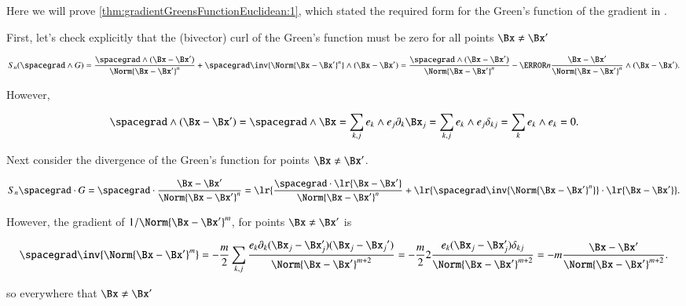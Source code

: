 %
%
\label{chap:gradientGreensFunctionProof}
Here we will prove \cref{thm:gradientGreensFunctionEuclidean:1}, which stated the required form for the Green's function of the gradient in .

First, let's check explicitly that the 
(bivector) curl of the Green's function must be zero for all
points \( \Bx \ne \Bx' \)

\begin{dmath}\label{eqn:gradientGreensFunctionEuclidean:140}
S_n (\spacegrad \wedge G)
=
\frac{\spacegrad \wedge (\Bx-\Bx')}{\Norm{\Bx - \Bx'}^{n}}
+
\spacegrad \inv{\Norm{\Bx - \Bx'}^{n}} \wedge (\Bx-\Bx')
=
\frac{\spacegrad \wedge (\Bx-\Bx')}{\Norm{\Bx - \Bx'}^{n}}
- \cancel{n
\frac{\Bx - \Bx'}{\Norm{\Bx - \Bx'}^{n}} \wedge (\Bx-\Bx')}.
\end{dmath}

However,

\begin{dmath}\label{eqn:gradientGreensFunctionEuclidean:160}
\spacegrad \wedge (\Bx-\Bx')
=
\spacegrad \wedge \Bx
=
\sum_{k,j} e_k \wedge e_j \partial_k \Bx_j
=
\sum_{k,j} e_k \wedge e_j \delta_{k j}
=
\sum_{k} e_k \wedge e_k
=
0.
\end{dmath}

Next consider the divergence of the Green's function for points \( \Bx \ne \Bx' \).

\begin{dmath}\label{eqn:gradientGreensFunctionEuclidean:120}
S_n \spacegrad \cdot G
=
\spacegrad \cdot \frac{\Bx - \Bx'}{\Norm{\Bx - \Bx'}^n}
=
\lr{ \frac{\spacegrad \cdot \lr{\Bx - \Bx'}}{\Norm{\Bx - \Bx'}^{n}} + \lr{ \spacegrad \inv{\Norm{\Bx - \Bx'}^{n}} } \cdot \lr{ \Bx - \Bx'} }.
\end{dmath}

However, the gradient of \( 1/\Norm{\Bx - \Bx'}^m \), for points \( \Bx \ne \Bx' \) is

\begin{dmath}\label{eqn:gradientGreensFunctionEuclidean:100}
\spacegrad \inv{\Norm{\Bx - \Bx'}^m}
=
-\frac{m}{2} \sum_{k,j} \frac{e_k \partial_k (\Bx_j - \Bx_j')(\Bx_j - {\Bx_j}')}{\Norm{\Bx - \Bx'}^{m+2}}
=
-\frac{m}{2} 2 \frac{e_k (\Bx_j - \Bx_j') \delta_{k j} }{\Norm{\Bx - \Bx'}^{m+2}}
=
-m \frac{ \Bx - \Bx'}{\Norm{\Bx - \Bx'}^{m+2}}.
\end{dmath}

so everywhere that \( \Bx \ne \Bx' \)

